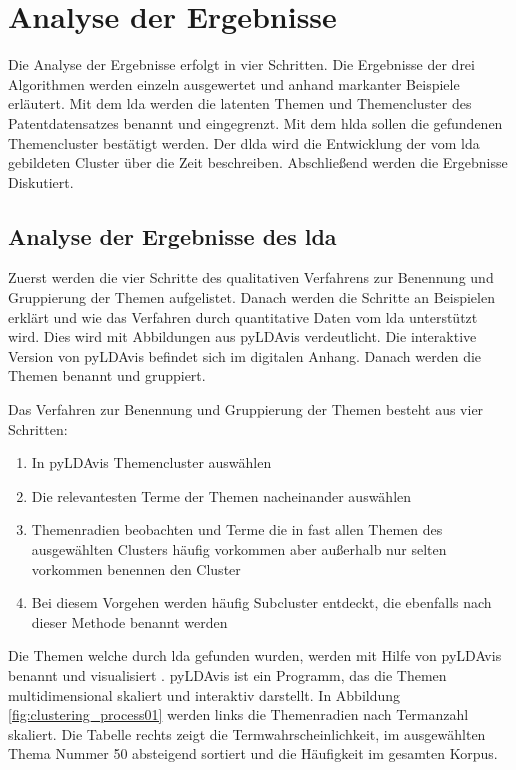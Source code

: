 \chapter{Analyse der Ergebnisse}


Die Analyse der Ergebnisse erfolgt in vier Schritten. Die Ergebnisse der drei Algorithmen werden einzeln ausgewertet und anhand markanter Beispiele erläutert. Mit dem \gls{lda} werden die latenten Themen und Themencluster des Patentdatensatzes benannt und eingegrenzt. Mit dem \gls{hlda} sollen die gefundenen Themencluster bestätigt werden. Der \gls{dlda} wird die Entwicklung der vom \gls{lda} gebildeten Cluster über die Zeit beschreiben. Abschließend werden die Ergebnisse Diskutiert.


\section{Analyse der Ergebnisse des \gls{lda}} \label{lda_analysis}

Zuerst werden die vier Schritte des qualitativen Verfahrens zur Benennung und Gruppierung der Themen aufgelistet. Danach werden die Schritte an Beispielen erklärt und wie das Verfahren durch quantitative Daten vom \gls{lda} unterstützt wird. Dies wird mit Abbildungen aus \gls{pyLDAvis} verdeutlicht. Die interaktive Version von \gls{pyLDAvis} befindet sich im digitalen Anhang. Danach werden die Themen benannt und gruppiert.

Das Verfahren zur Benennung und Gruppierung der Themen besteht aus vier Schritten:
\begin{enumerate}
	\item In \gls{pyLDAvis} Themencluster auswählen
	\item Die relevantesten Terme der Themen nacheinander auswählen
	\item Themenradien beobachten und Terme die in fast allen Themen des ausgewählten Clusters häufig vorkommen aber außerhalb nur selten vorkommen benennen den Cluster
	\item Bei diesem Vorgehen werden häufig Subcluster entdeckt, die ebenfalls nach dieser Methode benannt werden
\end{enumerate}

Die Themen welche durch \gls{lda} gefunden wurden, werden mit Hilfe von \gls{pyLDAvis} benannt und visualisiert \parencite[vgl.][S. 63]{sievert2014ldavis}. \gls{pyLDAvis} ist ein Programm, das die Themen multidimensional skaliert und interaktiv darstellt. In Abbildung \ref{fig:clustering_process01} werden links die Themenradien nach Termanzahl skaliert. Die Tabelle rechts zeigt die Termwahrscheinlichkeit, im ausgewählten Thema Nummer 50 absteigend sortiert und die Häufigkeit im gesamten Korpus.

